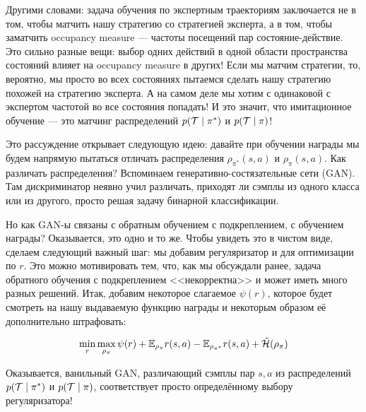 Другими словами: задача обучения по экспертным траекториям заключается не в том, чтобы матчить нашу стратегию со стратегией эксперта, а в том, чтобы заматчить occupancy measure --- частоты посещений пар состояние-действие. Это сильно разные вещи: выбор одних действий в одной области пространства состояний влияет на occupancy measure в других! Если мы матчим стратегии, то, вероятно, мы просто во всех состояниях пытаемся сделать нашу стратегию похожей на стратегию эксперта. А на самом деле мы хотим с одинаковой с экспертом частотой во все состояния попадать! И это значит, что имитационное обучение --- это матчинг распределений $p(\Traj \HM\mid \pi^*)$ и $p(\Traj \HM\mid \pi)$!

Это рассуждение открывает следующую идею: давайте при обучении награды мы будем напрямую пытаться отличать распределения $\rho_{\pi^*}(s, a)$ и $\rho_{\pi}(s, a)$. Как различать распределения? Вспоминаем генеративно-состязательные сети (GAN). Там дискриминатор неявно учил различать, приходят ли сэмплы из одного класса или из другого, просто решая задачу бинарной классификации.

Но как GAN-ы связаны с обратным обучением с подкреплением, с обучением награды? Оказывается, это одно и то же. Чтобы увидеть это в чистом виде, сделаем следующий важный шаг: мы добавим регуляризатор и для оптимизации по $r$. Это можно мотивировать тем, что, как мы обсуждали ранее, задача обратного обучения с подкреплением <<некорректна>> и может иметь много разных решений. Итак, добавим некоторое слагаемое $\psi(r)$, которое будет смотреть на нашу выдаваемую функцию награды и некоторым образом её дополнительно штрафовать:

\begin{equation}\label{game_pi_rho_reg}
\min\limits_{r} \max\limits_{\rho_\pi} \psi(r) + \mathbb{E}_{\rho_{\pi}} r(s, a) - \mathbb{E}_{\rho_{\pi^*}} r(s, a) + \tilde{\mathcal{H}}(\rho_\pi)
\end{equation}

Оказывается, ванильный GAN, различающий сэмплы пар $s, a$ из распределений $p(\Traj \HM\mid \pi^*)$ и $p(\Traj \HM\mid \pi)$, соответствует просто определённому выбору регуляризатора!

